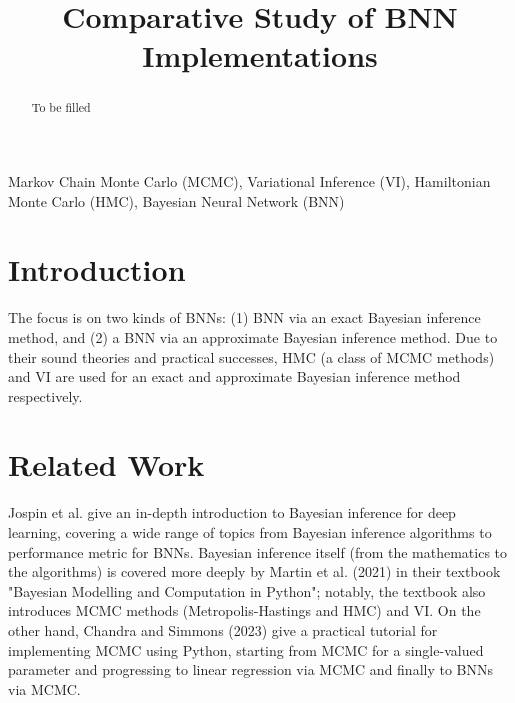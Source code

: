 \documentclass[conference]{IEEEtran}
\begin{document}



\title{Comparative Study of BNN Implementations\\}

\author{}

\maketitle

\begin{abstract}
To be filled
\end{abstract}

\begin{IEEEkeywords}
Markov Chain Monte Carlo (MCMC), Variational Inference (VI), Hamiltonian Monte Carlo (HMC), Bayesian Neural Network (BNN)
\end{IEEEkeywords}

\section{Introduction}
The focus is on two kinds of BNNs: (1) BNN via an exact Bayesian inference method, and (2) a BNN via an approximate Bayesian inference method. Due to their sound theories and practical successes, HMC (a class of MCMC methods) and VI are used for an exact and approximate Bayesian inference method respectively.

\section{Related Work}
Jospin et al. give an in-depth introduction to Bayesian inference for deep learning, covering a wide range of topics from Bayesian inference algorithms to performance metric for BNNs. Bayesian inference itself (from the mathematics to the algorithms) is covered more deeply by Martin et al. (2021) in their textbook "Bayesian Modelling and Computation in Python"; notably, the textbook also introduces MCMC methods (Metropolis-Hastings and HMC) and VI. On the other hand, Chandra and Simmons (2023) give a practical tutorial for implementing MCMC using Python, starting from MCMC for a single-valued parameter and progressing to linear regression via MCMC and finally to BNNs via MCMC.\\
\end{document}
